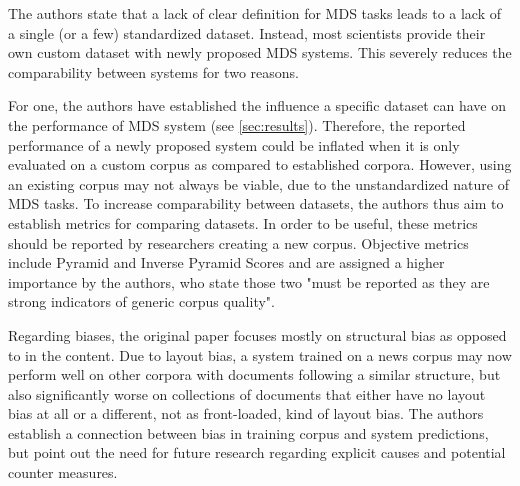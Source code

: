 \documentclass[20_original-paper.tex]{subfiles}
\begin{document}
The authors state that a lack of clear definition for MDS tasks leads to a lack of a single (or a few) standardized dataset.
Instead, most scientists provide their own custom dataset with newly proposed MDS systems.
This severely reduces the comparability between systems for two reasons.

For one, the authors have established the influence a specific dataset can have on the performance of MDS system (see \ref{sec:results}).
Therefore, the reported performance of a newly proposed system could be inflated when it is only evaluated on a custom corpus as compared to established corpora.
However, using an existing corpus may not always be viable, due to the unstandardized nature of MDS tasks.
To increase comparability between datasets, the authors thus aim to establish metrics for comparing datasets.
In order to be useful, these metrics should be reported by researchers creating a new corpus.
Objective metrics include Pyramid and Inverse Pyramid Scores and are assigned a higher importance by the authors, who state those two "must be
reported as they are strong indicators of generic corpus quality"\cite{dey-etal-2020-corpora}.


Regarding biases, the original paper focuses mostly on structural bias as opposed to in the content.
Due to layout bias, a system trained on a news corpus may now perform well on other corpora with documents following a similar structure, but also significantly worse on collections of documents that either have no layout bias at all or a different, not as front-loaded, kind of layout bias.\cite{leverage-lead-bias-https://doi.org/10.48550/arxiv.1912.11602}
The authors establish a connection between bias in training corpus and system predictions, but point out the need for future research regarding explicit causes and potential counter measures.
\end{document}
